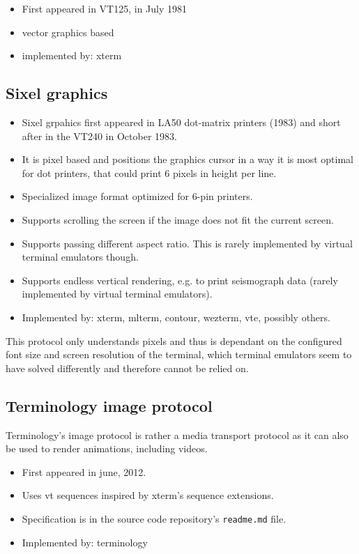 \documentclass[a4paper]{article}
\begin{document}
\begin{itemize}
    \item First appeared in VT125, in July 1981
    \item vector graphics based
    \item implemented by: xterm
\end{itemize}

\subsection{Sixel graphics}

\begin{itemize}
    \item Sixel grpahics first appeared in LA50 dot-matrix printers (1983) and short after in the VT240 in October 1983.
    \item It is pixel based and positions the graphics cursor in a way it is most optimal for dot printers,
        that could print 6 pixels in height per line.
    \item Specialized image format optimized for 6-pin printers.
    \item Supports scrolling the screen if the image does not fit the current screen.
    \item Supports passing different aspect ratio. This is rarely implemented by virtual terminal emulators though.
    \item Supports endless vertical rendering, e.g. to print seismograph data (rarely implemented by virtual terminal emulators).
    \item Implemented by: xterm, mlterm, contour, wezterm, vte, possibly others.
\end{itemize}

This protocol only understands pixels and thus is dependant on the
configured font size and screen resolution of the terminal, which
terminal emulators seem to have solved differently and therefore cannot
be relied on.

\subsection{Terminology image protocol}

Terminology's image protocol is rather a media transport protocol as it
can also be used to render animations, including videos.

\begin{itemize}
    \item First appeared in june, 2012.
    \item Uses vt sequences inspired by xterm's sequence extensions.
    \item Specification is in the source code repository's \texttt{readme.md} file.
    \item Implemented by: terminology
\end{itemize}
\end{document}
